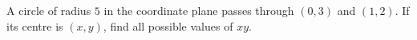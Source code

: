 A circle of radius $5$ in the coordinate plane passes through $(0,3)$ and $(1,2)$. If its centre is $(x,y)$, find all possible values of $xy$.
